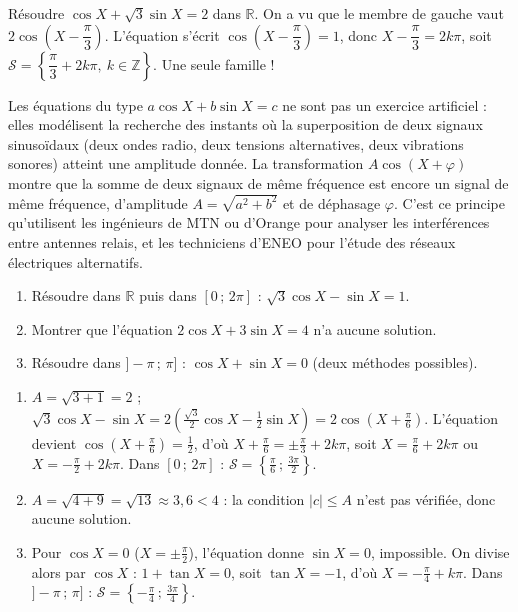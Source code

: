 \documentclass[11pt]{article}
\newcommand{\cle}[1]{{\popxbold\color{popdark}#1}}
\newcounter{popsec}
\newcounter{popsub}
\newcommand{\courssub}[1]{%
  \stepcounter{popsub}%
  \par\vspace{9pt}\noindent{\popxbold\fontsize{11.5}{13}\selectfont\color{popink}{\color{poporange}\thepopsec.\thepopsub}\hspace{6pt}#1}\par\nopagebreak\vspace{4pt}
}
\begin{document}
\begin{exemplebox}[Cas $c = A$]
Résoudre $\cos X + \sqrt{3}\sin X = 2$ dans $\mathbb{R}$. On a vu que le membre de gauche vaut $2\cos\left(X - \dfrac{\pi}{3}\right)$. L'équation s'écrit $\cos\left(X - \dfrac{\pi}{3}\right) = 1$, donc $X - \dfrac{\pi}{3} = 2k\pi$, soit $\mathcal{S} = \left\{\dfrac{\pi}{3} + 2k\pi,\ k \in \mathbb{Z}\right\}$. Une seule famille !
\end{exemplebox}

\courssub{Synthèse et ouverture}

\begin{savaistu}
Les équations du type $a\cos X + b\sin X = c$ ne sont pas un exercice artificiel : elles modélisent la recherche des instants où la \cle{superposition} de deux signaux sinusoïdaux (deux ondes radio, deux tensions alternatives, deux vibrations sonores) atteint une amplitude donnée. La transformation $A\cos(X+\varphi)$ montre que la somme de deux signaux de même fréquence est encore un signal de même fréquence, d'amplitude $A = \sqrt{a^2+b^2}$ et de déphasage $\varphi$. C'est ce principe qu'utilisent les ingénieurs de MTN ou d'Orange pour analyser les interférences entre antennes relais, et les techniciens d'ENEO pour l'étude des réseaux électriques alternatifs.
\end{savaistu}

\begin{exercice}
\begin{enumerate}
\item Résoudre dans $\mathbb{R}$ puis dans $[0\,;\,2\pi]$ : $\sqrt{3}\cos X - \sin X = 1$.
\item Montrer que l'équation $2\cos X + 3\sin X = 4$ n'a aucune solution.
\item Résoudre dans $]-\pi\,;\,\pi]$ : $\cos X + \sin X = 0$ (deux méthodes possibles).
\end{enumerate}
\end{exercice}

\begin{corrige}[Exercice]
\begin{enumerate}
\item $A = \sqrt{3+1} = 2$ ; $\sqrt{3}\cos X - \sin X = 2\left(\tfrac{\sqrt{3}}{2}\cos X - \tfrac{1}{2}\sin X\right) = 2\cos\left(X + \tfrac{\pi}{6}\right)$. L'équation devient $\cos\left(X + \tfrac{\pi}{6}\right) = \tfrac{1}{2}$, d'où $X + \tfrac{\pi}{6} = \pm\tfrac{\pi}{3} + 2k\pi$, soit $X = \tfrac{\pi}{6} + 2k\pi$ ou $X = -\tfrac{\pi}{2} + 2k\pi$. Dans $[0\,;\,2\pi]$ : $\mathcal{S} = \left\{\tfrac{\pi}{6}\,;\,\tfrac{3\pi}{2}\right\}$.
\item $A = \sqrt{4+9} = \sqrt{13} \approx 3{,}6 < 4$ : la condition $|c| \leq A$ n'est pas vérifiée, donc aucune solution.
\item Pour $\cos X = 0$ ($X = \pm\tfrac{\pi}{2}$), l'équation donne $\sin X = 0$, impossible. On divise alors par $\cos X$ : $1 + \tan X = 0$, soit $\tan X = -1$, d'où $X = -\tfrac{\pi}{4} + k\pi$. Dans $]-\pi\,;\,\pi]$ : $\mathcal{S} = \left\{-\tfrac{\pi}{4}\,;\,\tfrac{3\pi}{4}\right\}$.
\end{enumerate}
\end{corrige}
\end{document}

